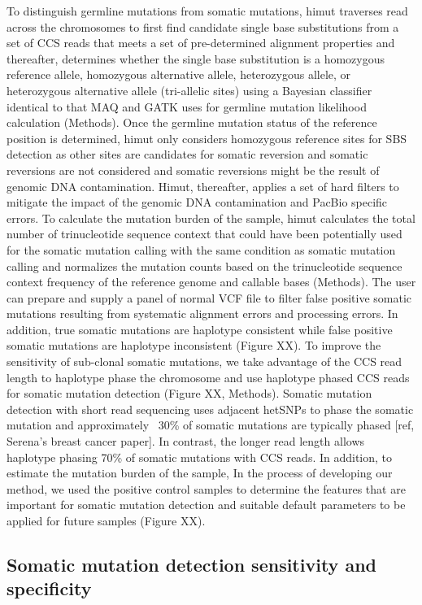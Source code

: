 To distinguish germline mutations from somatic mutations, himut traverses read across the chromosomes to first find candidate single base substitutions from a set of CCS reads that meets a set of pre-determined alignment properties and thereafter, determines whether the single base substitution is a homozygous reference allele, homozygous alternative allele, heterozygous allele, or heterozygous alternative allele (tri-allelic sites) using a Bayesian classifier identical to that MAQ and GATK uses for germline mutation likelihood calculation (Methods). Once the germline mutation status of the reference position is determined, himut only considers homozygous reference sites for SBS detection as other sites are candidates for somatic reversion and somatic reversions are not considered and somatic reversions might be the result of genomic DNA contamination. Himut, thereafter, applies a set of hard filters to mitigate the impact of the genomic DNA contamination and PacBio specific errors. To calculate the mutation burden of the sample, himut calculates the total number of trinucleotide sequence context that could have been potentially used for the somatic mutation calling with the same condition as somatic mutation calling and normalizes the mutation counts based on the trinucleotide sequence context frequency of the reference genome and callable bases (Methods). The user can prepare and supply a panel of normal VCF file to filter false positive somatic mutations resulting from systematic alignment errors and processing errors. In addition, true somatic mutations are haplotype consistent while false positive somatic mutations are haplotype inconsistent (Figure XX). To improve the sensitivity of sub-clonal somatic mutations, we take advantage of the CCS read length to haplotype phase the chromosome and use haplotype phased CCS reads for somatic mutation detection (Figure XX, Methods). Somatic mutation detection with short read sequencing uses adjacent hetSNPs to phase the somatic mutation and approximately ~30\% of somatic mutations are typically phased [ref, Serena’s breast cancer paper]. In contrast, the longer read length allows haplotype phasing 70\% of somatic mutations with CCS reads. In addition, to estimate the mutation burden of the sample, In the process of developing our method, we used the positive control samples to determine the features that are important for somatic mutation detection and suitable default parameters to be applied for future samples (Figure XX).

\subsection{Somatic mutation detection sensitivity and specificity}

